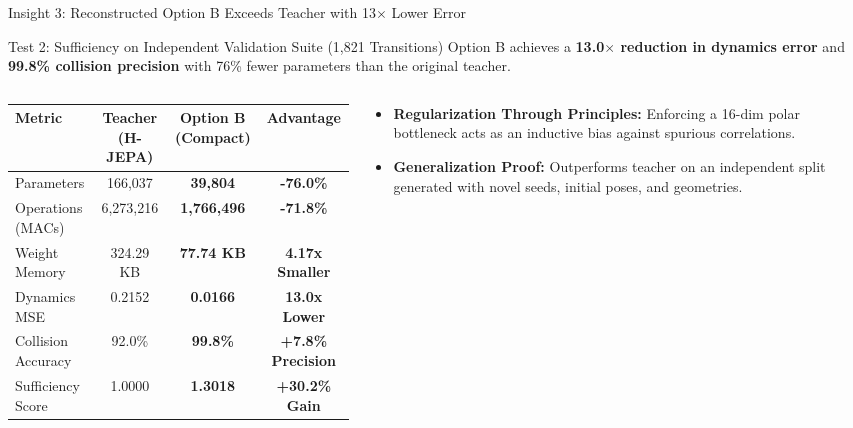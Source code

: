 \documentclass[aspectratio=169, 10pt]{beamer}
\begin{document}
\begin{frame}{Insight 3: Reconstructed Option B Exceeds Teacher with 13$\times$ Lower Error}
  \begin{block}{Test 2: Sufficiency on Independent Validation Suite (1,821 Transitions)}
    Option B achieves a \textbf{13.0$\times$ reduction in dynamics error} and \textbf{99.8\% collision precision} with 76\% fewer parameters than the original teacher.
  \end{block}
  \vspace{-0.2cm}
  \begin{columns}[T]
    \begin{column}{0.54\textwidth}
      \setlength{\tabcolsep}{2pt}
      \begin{table}
        \centering
        \scriptsize
        \begin{tabular}{lccc}
          \toprule
          \textbf{Metric} & \textbf{Teacher (H-JEPA)} & \textbf{Option B (Compact)} & \textbf{Advantage} \\
          \midrule
          Parameters & 166,037 & \textbf{39,804} & \textbf{-76.0\%} \\
          Operations (MACs) & 6,273,216 & \textbf{1,766,496} & \textbf{-71.8\%} \\
          Weight Memory & 324.29 KB & \textbf{77.74 KB} & \textbf{4.17x Smaller} \\
          Dynamics MSE & 0.2152 & \textbf{0.0166} & \textbf{13.0x Lower} \\
          Collision Accuracy & 92.0\% & \textbf{99.8\%} & \textbf{+7.8\% Precision} \\
          Sufficiency Score & 1.0000 & \textbf{1.3018} & \textbf{+30.2\% Gain} \\
          \bottomrule
        \end{tabular}
      \end{table}
    \end{column}
    \begin{column}{0.44\textwidth}
      \begin{itemize}
        \item \textbf{Regularization Through Principles:} Enforcing a 16-dim polar bottleneck acts as an inductive bias against spurious correlations.
        \item \textbf{Generalization Proof:} Outperforms teacher on an independent split generated with novel seeds, initial poses, and geometries.
      \end{itemize}
    \end{column}
  \end{columns}
\end{frame}
\end{document}
